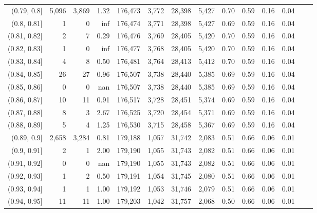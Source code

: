 \begin{tabular}{rrrrrrrrrrrrrr}
(0.79, 0.8]    &   5,096 &  3,869 &   1.32 &  176,473 &    3,772 &  28,398 &   5,427 &  0.70 &  0.59 &  0.16 &      0.04 \\
(0.8, 0.81]    &       1 &      0 &    inf &  176,474 &    3,771 &  28,398 &   5,427 &  0.69 &  0.59 &  0.16 &      0.04 \\
(0.81, 0.82]   &       2 &      7 &   0.29 &  176,476 &    3,769 &  28,405 &   5,420 &  0.70 &  0.59 &  0.16 &      0.04 \\
(0.82, 0.83]   &       1 &      0 &    inf &  176,477 &    3,768 &  28,405 &   5,420 &  0.70 &  0.59 &  0.16 &      0.04 \\
(0.83, 0.84]   &       4 &      8 &   0.50 &  176,481 &    3,764 &  28,413 &   5,412 &  0.70 &  0.59 &  0.16 &      0.04 \\
(0.84, 0.85]   &      26 &     27 &   0.96 &  176,507 &    3,738 &  28,440 &   5,385 &  0.69 &  0.59 &  0.16 &      0.04 \\
(0.85, 0.86]   &       0 &      0 &    nan &  176,507 &    3,738 &  28,440 &   5,385 &  0.69 &  0.59 &  0.16 &      0.04 \\
(0.86, 0.87]   &      10 &     11 &   0.91 &  176,517 &    3,728 &  28,451 &   5,374 &  0.69 &  0.59 &  0.16 &      0.04 \\
(0.87, 0.88]   &       8 &      3 &   2.67 &  176,525 &    3,720 &  28,454 &   5,371 &  0.69 &  0.59 &  0.16 &      0.04 \\
(0.88, 0.89]   &       5 &      4 &   1.25 &  176,530 &    3,715 &  28,458 &   5,367 &  0.69 &  0.59 &  0.16 &      0.04 \\
(0.89, 0.9]    &   2,658 &  3,284 &   0.81 &  179,188 &    1,057 &  31,742 &   2,083 &  0.51 &  0.66 &  0.06 &      0.01 \\
(0.9, 0.91]    &       2 &      1 &   2.00 &  179,190 &    1,055 &  31,743 &   2,082 &  0.51 &  0.66 &  0.06 &      0.01 \\
(0.91, 0.92]   &       0 &      0 &    nan &  179,190 &    1,055 &  31,743 &   2,082 &  0.51 &  0.66 &  0.06 &      0.01 \\
(0.92, 0.93]   &       1 &      2 &   0.50 &  179,191 &    1,054 &  31,745 &   2,080 &  0.51 &  0.66 &  0.06 &      0.01 \\
(0.93, 0.94]   &       1 &      1 &   1.00 &  179,192 &    1,053 &  31,746 &   2,079 &  0.51 &  0.66 &  0.06 &      0.01 \\
(0.94, 0.95]   &      11 &     11 &   1.00 &  179,203 &    1,042 &  31,757 &   2,068 &  0.50 &  0.66 &  0.06 &      0.01 \\

\end{tabular}
